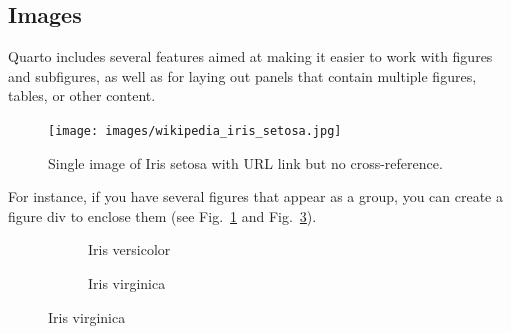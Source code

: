 \documentclass[
  letterpaper,
  DIV=11,
  numbers=noendperiod]{scrartcl}
\begin{document}
\subsection{Images}\label{images}

Quarto includes several features aimed at making it easier to work with
figures and subfigures, as well as for laying out panels that contain
multiple figures, tables, or other content.

\begin{figure}[H]

{\centering \texttt{[image: images/wikipedia\_iris\_setosa.jpg]}

}

\caption{Single image of Iris setosa with URL link but no
cross-reference.}

\end{figure}%

For instance, if you have several figures that appear as a group, you
can create a figure div to enclose them (see Fig.~\ref{fig-versicolor}
and Fig.~\ref{fig-virginica}).

\begin{figure}

\begin{minipage}{0.50\linewidth}

\begin{figure}[H]


\caption{\label{fig-versicolor}Iris versicolor}

\end{figure}%

\end{minipage}%
%
\begin{minipage}{0.50\linewidth}

\begin{figure}[H]


\caption{\label{fig-virginica}Iris virginica}

\end{figure}%

\end{minipage}%

\end{figure}%
\end{document}
